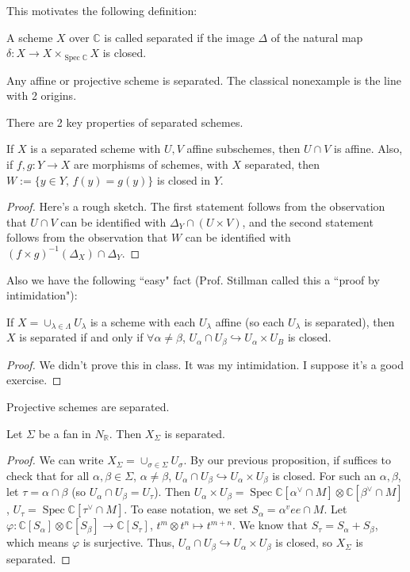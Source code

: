 \documentclass[a4paper,12pt]{amsart}
\newcommand{\C}{\ensuremath{\mathbb{C}}}
\newcommand{\R}{\ensuremath{\mathbb{R}}}
\DeclareMathOperator{\Spec}{Spec}
\begin{document}
\noindent This motivates the following definition:
\begin{definition}
A scheme $X$ over $\C$ is called separated if the image $\Delta$ of the natural map $\delta: X \to X \times_{\Spec \C} X$ is closed.
\end{definition}
\begin{example}
Any affine or projective scheme is separated. The classical nonexample is the line with 2 origins. 
\end{example}
\noindent There are 2 key properties of separated schemes. 
\begin{Proposition}
    If $X$ is a separated scheme with $U,V$ affine subschemes, then $U \cap V$ is affine. Also, if $f,g: Y \to X$ are morphisms of schemes, with $X$ separated, then $W := \{ y \in Y, \, f(y) = g(y)\}$ is closed in $Y$.
\end{Proposition}
\begin{proof}
Here's a rough sketch. The first statement follows from the observation that $U \cap V$ can be identified with $\Delta_Y \cap (U \times V)$, and the second statement follows from the observation that $W$ can be identified with $(f \times g)^{-1}(\Delta_X) \cap \Delta_Y$.
\end{proof}
\noindent Also we have the following ``easy" fact (Prof. Stillman called this a ``proof by intimidation"):
\begin{proposition}
    If $X = \cup_{\lambda \in \Lambda} U_\lambda$ is a scheme with each $U_\lambda$ affine (so each $U_\lambda$ is separated), then $X$ is separated if and only if $\forall \alpha \neq \beta$, $U_\alpha \cap U_\beta \hookrightarrow U_\alpha \times U_B$ is closed.
\end{proposition}
\begin{proof}
We didn't prove this in class. It was my intimidation. I suppose it's a good exercise.
\end{proof}
\begin{corollary}
    Projective schemes are separated.
\end{corollary}
\begin{Theorem}
    Let $\Sigma$ be a fan in $N_\R$. Then $X_\Sigma$ is separated.
\end{Theorem}
\begin{proof}
We can write $X_\Sigma = \cup_{\sigma \in \Sigma} U_\sigma$. By our previous proposition, if suffices to check that for all $\alpha, \beta \in \Sigma$, $\alpha \neq \beta$, $U_{\alpha} \cap U_{\beta} \hookrightarrow U_\alpha \times U_\beta$ is closed. For such an $\alpha, \beta$, let $\tau = \alpha \cap \beta$ (so $U_\alpha \cap U_\beta = U_\tau$). Then $U_\alpha \times U_\beta = \Spec \C[\alpha^\vee \cap M] \otimes \C[\beta^\vee \cap M]$, $U_\tau = \Spec \C[\tau^\vee \cap M]$. To ease notation, we set $S_\alpha = \alpha^vee \cap M$. Let $\varphi: \C[S_\alpha] \otimes \C[S_\beta] \to \C[S_\tau]$, $t^m \otimes t^n \mapsto t^{m+n}$. We know that $S_\tau = S_\alpha + S_\beta$, which means $\varphi$ is surjective. Thus, $U_\alpha \cap U_\beta \hookrightarrow U_\alpha \times U_\beta$ is closed, so $X_\Sigma$ is separated.
\end{proof}
\end{document}
